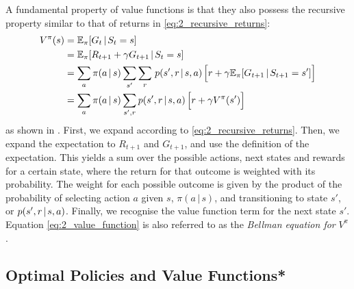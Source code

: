 A fundamental property of value functions is that they also possess the recursive property similar to that of returns in \eqref{eq:2_recursive_returns}:
\begin{align}
    V^\pi(s) &= \mathbb{E}_\pi [G_t \hspace{0.5mm} | \hspace{0.5mm} S_t = s] \nonumber \\
    &= \mathbb{E}_\pi [R_{t+1} + \gamma G_{t+1} \hspace{0.5mm} | \hspace{0.5mm} S_t = s] \nonumber \\
    &= \sum_a \pi(a\,|\,s) \sum_{s'}\sum_r \hspace{0.5mm} p(s', r \hspace{0.5mm}|\hspace{0.5mm} s, a) \hspace{0.5mm} \Big[r + \gamma \mathbb{E}_\pi [G_{t+1} \hspace{0.5mm} | \hspace{0.5mm} S_{t+1} = s'] \Big] \nonumber \\
    &= \sum_a \pi(a\,|\,s) \sum_{s',r} p(s', r \hspace{0.5mm}|\hspace{0.5mm} s, a) \hspace{0.5mm} \Big[r + \gamma V^\pi(s') \Big] \label{eq:2_value_function}
\end{align}
as shown in \cite{suttonAndBartoBook}. First, we expand according to \eqref{eq:2_recursive_returns}. Then, we expand the expectation to $R_{t+1}$ and $G_{t+1}$, and use the definition of the expectation. This yields a sum over the possible actions, next states and rewards for a certain state, where the return for that outcome is weighted with its probability. The weight for each possible outcome is given by the product of the probability of selecting action $a$ given $s$, $\pi(a\,|\,s)$, and transitioning to state $s'$, or $ p(s', r \hspace{0.5mm}|\hspace{0.5mm} s, a)$.
Finally, we recognise the value function term for the next state $s'$. Equation \eqref{eq:2_value_function} is also referred to as the \textit{Bellman equation for} $V^\pi$ \cite{BellmanDreyfus1962Book}.

\subsection{Optimal Policies and Value Functions*}
\label{subsec:2_optimal_policies_and_value_funcs}

